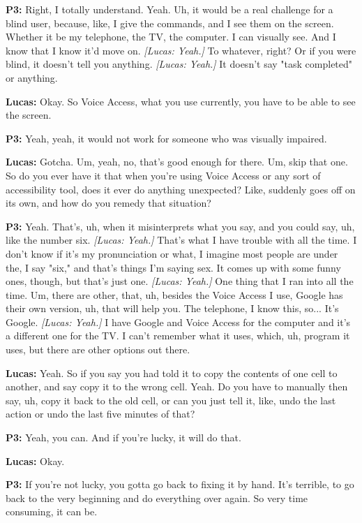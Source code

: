 \textbf{P3:} Right, I totally understand. Yeah. Uh, it would be a real challenge for a blind user, because, like, I give the commands, and I see them on the screen. Whether it be my telephone, the TV, the computer. I can visually see. And I know that I know it'd move on. \textit{[Lucas: Yeah.]} To whatever, right? Or if you were blind, it doesn't tell you anything. \textit{[Lucas: Yeah.]} It doesn't say "task completed" or anything. 

\textbf{Lucas:} Okay. So Voice Access, what you use currently, you have to be able to see the screen. 

\textbf{P3:} Yeah, yeah, it would not work for someone who was visually impaired. 

\textbf{Lucas:} Gotcha. Um, yeah, no, that's good enough for there. Um, skip that one. So do you ever have it that when you're using Voice Access or any sort of accessibility tool, does it ever do anything unexpected? Like, suddenly goes off on its own, and how do you remedy that situation? 

\textbf{P3:} Yeah. That's, uh, when it misinterprets what you say, and you could say, uh, like the number six. \textit{[Lucas: Yeah.]} That's what I have trouble with all the time. I don't know if it's my pronunciation or what, I imagine most people are under the, I say "six," and that's things I'm saying sex. It comes up with some funny ones, though, but that's just one. \textit{[Lucas: Yeah.]} One thing that I ran into all the time. Um, there are other, that, uh, besides the Voice Access I use, Google has their own version, uh, that will help you. The telephone, I know this, so... It's Google. \textit{[Lucas: Yeah.]} I have Google and Voice Access for the computer and it's a different one for the TV. I can't remember what it uses, which, uh, program it uses, but there are other options out there. 

\textbf{Lucas:} Yeah. So if you say you had told it to copy the contents of one cell to another, and say copy it to the wrong cell. Yeah. Do you have to manually then say, uh, copy it back to the old cell, or can you just tell it, like, undo the last action or undo the last five minutes of that? 

\textbf{P3:} Yeah, you can. And if you're lucky, it will do that. 

\textbf{Lucas:} Okay. 

\textbf{P3:} If you're not lucky, you gotta go back to fixing it by hand. It's terrible, to go back to the very beginning and do everything over again. So very time consuming, it can be. 

